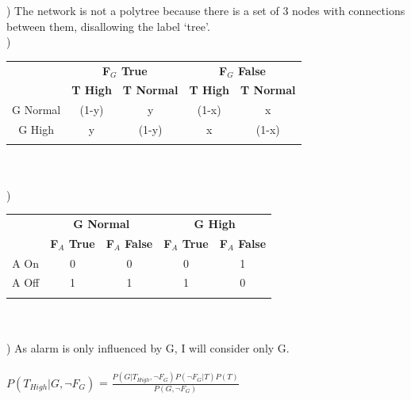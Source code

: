 \documentclass[12pt]{article}
\begin{document}
) The network is not a polytree because there is a set of 3 nodes with connections between them, disallowing the label `tree'.\\

)
\begin{tabular}{|c||c|c|c|c|}
\hhline{-||----}
& \multicolumn{2}{c}{\textbf{F$_G$ True}} & \multicolumn{2}{|c|}{\textbf{F$_G$ False}}\\[-.2em]
\hhline{~::----}
 & \textbf{T High} & \textbf{T Normal} & \textbf{T High} & \textbf{T Normal}\\
\hhline{=::====}
G Normal & (1-y) & y & (1-x) & x \\
\hhline{-||----}
G High & y & (1-y) & x & (1-x) \\
\hhline{-||----}
\end{tabular}\\\\

)
\begin{tabular}{|c||c|c|c|c|}
\hhline{-||----}
& \multicolumn{2}{c}{\textbf{G Normal}} & \multicolumn{2}{|c|}{\textbf{G High}}\\[-.2em]
\hhline{~::----}
 & \textbf{F$_A$ True} & \textbf{F$_A$ False} & \textbf{F$_A$ True} & \textbf{F$_A$ False}\\
\hhline{=::====}
A On & 0 & 0 & 0 & 1 \\
\hhline{-||----}
A Off & 1 & 1 & 1 & 0 \\
\hhline{-||----}
\end{tabular}\\\\

) As alarm is only influenced by G, I will consider only G.\\\\
\indent $P(T_{High}|G,\neg F_G)$ = {\Large $\frac{P(G|T_{High},\neg F_G)P(\neg F_G|T)P(T)}{P(G,\neg F_G)}$}\\



\noindent \hrulefill \\\pagebreak
\end{document}

